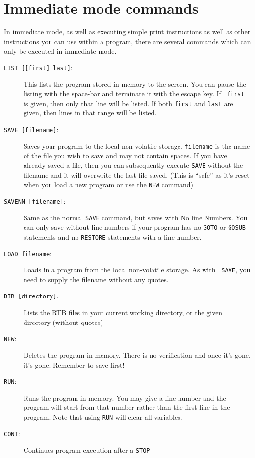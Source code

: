 \chapter{Immediate mode commands}

In immediate mode, as well as executing simple print instructions as
well as other instructions you can use within a program, there are several
commands which can only be executed in immediate mode.

\begin{description}
\item[{\tt LIST [[first] last]}:]
This lists the program stored in memory to the screen. You can pause the
listing with the space-bar and terminate it with the escape key. If {\tt
first} is given, then only that line will be listed. If both {\tt first}
and {\tt last} are given, then lines in that range will be listed.
\item[{\tt SAVE [filename]}:]
Saves your program to the local non-volatile storage. {\tt filename} is
the name of the file you wish to save and may not contain spaces. If you
have already saved a file, then you can subsequently execute {\tt SAVE}
without the filename and it will overwrite the last file saved. (This is
``safe'' as it's reset when you load a new program or use the {\tt NEW}
command)
\item[{\tt SAVENN [filename]}:]
Same as the normal {\tt SAVE} command, but saves with No line
Numbers. You can only save without line numbers if your program has no
{\tt GOTO} or {\tt GOSUB} statements and no {\tt RESTORE} statements
with a line-number.
\item[{\tt LOAD filename}:]
Loads in a program from the local non-volatile storage. As with {\tt
SAVE}, you need to supply the filename without any quotes.
\item[{\tt DIR [directory]}:]
Lists the RTB files in your current working directory, or the given
directory (without quotes)
\item[{\tt NEW}:]
Deletes the program in memory. There is no verification and once it's
gone, it's gone. Remember to save first!
\item[{\tt RUN}:]
Runs the program in memory. You may give a line number and the
program will start from that number rather than the first line in the
program. Note that using {\tt RUN} will clear all variables.
\item[{\tt CONT}:]
Continues program execution after a {\tt STOP}

\end{description}
